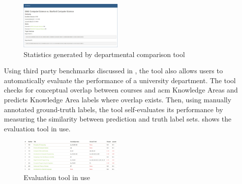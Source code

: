 
\begin{figure}
  \centering
  \includegraphics[width=0.45\textwidth]{figures/screenshots/compare/statistics.png}
  \caption{Statistics generated by departmental comparison tool\label{fig:statistics}}
\end{figure}


Using third party benchmarks discussed in , the tool also allows users to automatically evaluate the performance of a university department.
The tool checks for conceptual overlap between courses and \ac{acm} Knowledge Areas and predicts Knowledge Area labels where overlap exists.
Then, using manually annotated ground-truth labels, the tool self-evaluates its performance by measuring the similarity between prediction and truth label sets.
 shows the evaluation tool in use.


\begin{figure}
  \centering
  \includegraphics[width=0.45\textwidth]{figures/screenshots/evaluate/evaluation.png}
  \caption{Evaluation tool in use\label{fig:evaluation}}
\end{figure}

